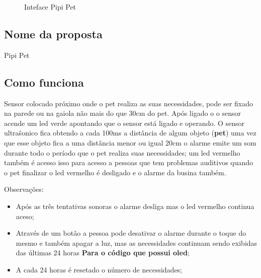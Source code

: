 \documentclass[12pt,a4paper]{article}
\begin{document}
\begin{figure}[htb!]
	\centering
	\qquad
	\caption{Inteface Pipi Pet}
	\label{fig:interface}
\end{figure}

\subsection{Nome da proposta}
Pipi Pet

\subsection{Como funciona}
Sensor colocado próximo onde o pet realiza as suas necessidades, pode ser
fixado na parede ou na gaiola não mais do que 30cm do pet. Após ligado o
o sensor acende um led verde apontando que o sensor está ligado e operando. O
sensor ultraŝonico fica obtendo a cada 100ms a distância de algum objeto
(\textbf{pet}) uma vez que esse objeto fica a uma distância menor ou igual
20cm o alarme emite um som durante todo o período que o pet realiza suas 
necessidades; um led vermelho também é acesso isso para acesso a pessoas
que tem problemas auditivos quando o pet finalizar o led vermelho é desligado e 
o alarme da busina também.

Observações:
\begin{itemize}
	\item Após as três tentativas sonoras o alarme desliga mas o led vermelho 
		continua aceso;
	\item Através de um botão a pessoa pode desativar o alarme durante o toque do
		mesmo e também apagar a luz, mas as necessidades continuam sendo exibidas
		das últimas 24 horas \textbf{Para o código que possui oled};
	\item A cada 24 horas é resetado o número de necessidades;
\end{itemize}
\end{document}
